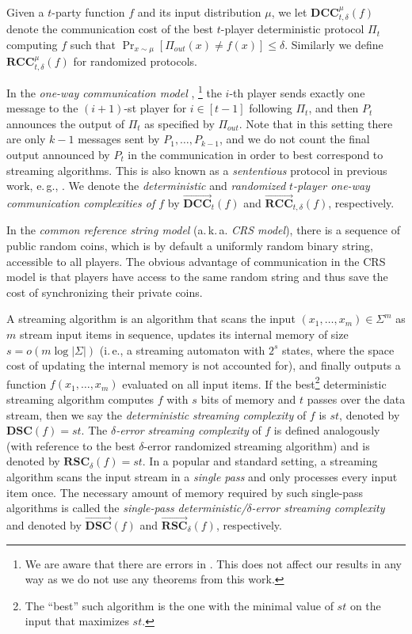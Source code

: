 \documentclass[11pt]{article}
\numberwithin{equation}{section}
\theoremstyle{definition}
\theoremstyle{plain}
\newcommand{\ie}{i.\,e.}
\newcommand{\eg}{e.\,g.}
\newcommand{\follows}{\ensuremath{\sim}}
\newcommand{\error}{\ensuremath{\delta}}
\newcommand{\littleo}[1]{\ensuremath{{o \left( {#1} \right)}}}
\newcommand{\alphabet}{\ensuremath{\Sigma}}
\newcommand{\dcc}{\ensuremath{\mathbf{DCC}}}
\newcommand{\rcc}{\ensuremath{\mathbf{RCC}}}
\newcommand{\dsc}{\ensuremath{\mathbf{DSC}}}
\newcommand{\rsc}{\ensuremath{\mathbf{RSC}}}
\newcommand{\dccone}{\ensuremath{\overrightarrow{\mathbf{DCC}}}}
\newcommand{\rccone}{\ensuremath{\overrightarrow{\mathbf{RCC}}}}
\newcommand{\dscone}{\ensuremath{\overrightarrow{\mathbf{DSC}}}}
\newcommand{\rscone}{\ensuremath{\overrightarrow{\mathbf{RSC}}}}
\begin{document}
Given a $t$-party function $f$ and its input distribution $\mu$, we let $\dcc^{\mu}_{t,\error}(f)$
denote the communication cost of the best $t$-player deterministic protocol $\Pi_t$ computing $f$ such that 
$\Pr_{x\follows \mu}\left[ \Pi_{out}(x)\ne f(x) \right] \le \error$.
Similarly we define  $\rcc^{\mu}_{t,\error}(f)$ for randomized protocols.

%
In the \emph{one-way communication model} \cite{papadimitriou1984communication,ablayev1996lower,kremer1999randomized}, \footnote{We are aware that there are errors in \cite{kremer1999randomized}. This does not affect our results in any way as we do not use any theorems from this work.}
the $i$-th player sends exactly one message to the $(i+1)$-st player for $i\in[t-1]$ following $\Pi_t$,
and then $P_t$ announces the output of $\Pi_t$ as specified by $\Pi_{out}$.
Note that in this setting there are only $k-1$ messages sent by $P_1,\dots, P_{k-1}$, and we do not count the final output announced by $P_t$ in the communication in order to best correspond to streaming algorithms.
This is also known as a \emph{sententious} protocol in previous work, \eg, \cite{Viola:2013we}.
%
We denote the \emph{deterministic} and \emph{randomized} \emph{$t$-player one-way communication complexities of $f$} by $\dccone_t(f)$ and $\rccone_{t,\error}(f)$,
%
%
 respectively.  %

In the \emph{common reference string model} (a.\,k.\,a. \emph{CRS model}), 
there is a sequence of public random coins, which is by default a uniformly random binary string, accessible to all players.
The obvious advantage of communication in the CRS model is that players 
have access to the same random string and thus 
save the cost of synchronizing their private coins.

A streaming algorithm is an algorithm that scans the input $(x_1,\dots,x_m)\in\alphabet^m$ as $m$ stream input items in sequence, updates its internal memory of size $s=\littleo{m \log|\alphabet|}$ (\ie, a streaming automaton with $2^s$ states, where the space cost of updating the internal memory is not accounted for),
and finally outputs a function $f(x_1,\dots,x_m)$ evaluated on all input items. 
If the best\footnote{{\color{black}The ``best'' such algorithm is the one with the minimal value of $st$ on the input that maximizes $st$.}}
%
%
%
%
%
%
%
deterministic streaming algorithm 
computes $f$ with $s$ bits of memory and $t$ passes over the data 
stream, then we say the \emph{deterministic}
\emph{streaming complexity} of $f$ is $st$, denoted by $\dsc(f)=st$.
The \emph{$\error$-error} \emph{streaming complexity} of $f$
is defined analogously (with reference to the best
$\error$-error randomized streaming algorithm) and is denoted
by $\rsc_\error(f)=st$.     %
%
%
In a popular and standard setting, a streaming algorithm scans the input stream in a \emph{single pass} and only processes every input item once. 
The necessary amount of memory required by such single-pass algorithms is called the \emph{single-pass deterministic/$\error$-error streaming complexity} and denoted by $\dscone(f)$ and $\rscone_\error(f)$, respectively.
%
%
\end{document}
